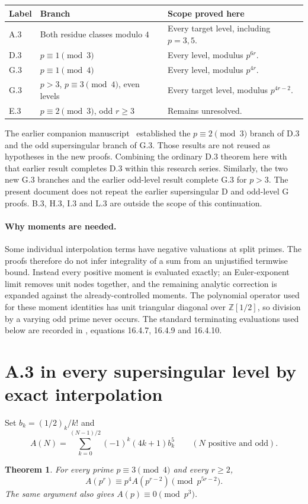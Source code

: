 \documentclass[11pt,letterpaper]{article}
\newtheorem{theorem}{Theorem}[section]
\numberwithin{equation}{section}
\begin{document}
\begin{center}\small
\begin{tabular}{@{}p{}p{}p{}@{}}
\toprule
Label & Branch & Scope proved here\\
\midrule
A.3 & Both residue classes modulo $4$ & Every target level, including $p=3,5$.\\
D.3 & $p\equiv1\pmod3$ & Every level, modulus $p^{6r}$.\\
G.3 & $p\equiv1\pmod4$ & Every level, modulus $p^{4r}$.\\
G.3 & $p>3$, $p\equiv3\pmod4$, even levels & Every target level, modulus $p^{4r-2}$.\\
E.3 & $p\equiv2\pmod3$, odd $r\ge3$ & Remains unresolved.\\
\bottomrule
\end{tabular}
\end{center}
The earlier companion manuscript~\cite{V-Companion} established the $p\equiv2\pmod3$
branch of D.3 and the odd supersingular branch of G.3. Those results
are not reused as hypotheses in the new proofs. Combining the
ordinary D.3 theorem here with that earlier result completes D.3
within this research series. Similarly, the two new G.3 branches
and the earlier odd-level result complete G.3 for $p>3$.
The present document does not repeat the earlier supersingular
D and odd-level G proofs. B.3, H.3, I.3 and L.3 are outside
the scope of this continuation.

\paragraph{Why moments are needed.}
Some individual interpolation terms have negative valuations at
split primes. The proofs therefore do not infer integrality of a
sum from an unjustified termwise bound. Instead every positive
moment is evaluated exactly; an Euler-exponent limit removes unit
nodes together, and the remaining analytic correction is expanded
against the already-controlled moments. The polynomial operator
used for these moment identities has unit triangular diagonal over
$\mathbb Z[1/2]$, so division by a varying odd prime never occurs.
The standard terminating evaluations used below are recorded in
\cite{V-DLMF}, equations 16.4.7, 16.4.9 and 16.4.10.

\section{A.3 in every supersingular level by exact interpolation}\label{loc-V-2}
\label{V-sec:a-supersingular-all}
Set $b_k=(1/2)_k/k!$ and
\[
 A(N)=\sum_{k=0}^{(N-1)/2}(-1)^k(4k+1)b_k^5\qquad(N\text{ positive and odd}).
\]
\begin{theorem}\label{V-thm:a-supersingular-all}
For every prime $p\equiv3\pmod4$ and every $r\ge2$,
\[
 A(p^r)\equiv p^4A(p^{r-2})\pmod{p^{5r-2}}.
\]
The same argument also gives $A(p)\equiv0\pmod{p^3}$.
\end{theorem}
\end{document}
